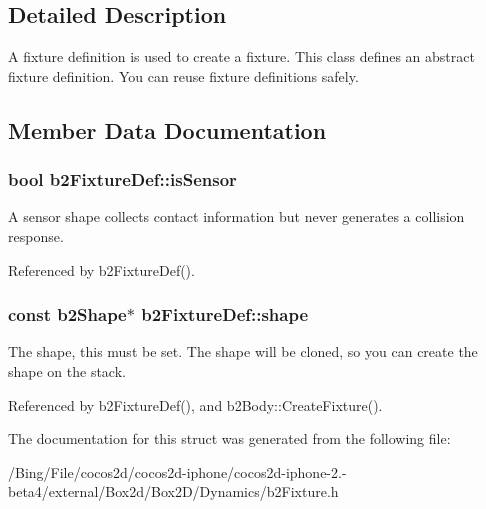 \subsection{Detailed Description}
A fixture definition is used to create a fixture. This class defines an abstract fixture definition. You can reuse fixture definitions safely. 

\subsection{Member Data Documentation}
\hypertarget{structb2_fixture_def_ac8cfcc6208663c92861eaab3b3fdc57e}{
\subsubsection[{is\-Sensor}]{\setlength{\rightskip}{0pt plus 5cm}bool {\bf b2\-Fixture\-Def\-::is\-Sensor}}}\label{structb2_fixture_def_ac8cfcc6208663c92861eaab3b3fdc57e}
A sensor shape collects contact information but never generates a collision response. 

Referenced by b2\-Fixture\-Def().

\hypertarget{structb2_fixture_def_a1e41753d89abf3443e7897e2498a3240}{
\subsubsection[{shape}]{\setlength{\rightskip}{0pt plus 5cm}const {\bf b2\-Shape}$\ast$ {\bf b2\-Fixture\-Def\-::shape}}}\label{structb2_fixture_def_a1e41753d89abf3443e7897e2498a3240}
The shape, this must be set. The shape will be cloned, so you can create the shape on the stack. 

Referenced by b2\-Fixture\-Def(), and b2\-Body\-::\-Create\-Fixture().



The documentation for this struct was generated from the following file\-:\begin{DoxyCompactItemize}
\item 
/\-Bing/\-File/cocos2d/cocos2d-\/iphone/cocos2d-\/iphone-\/2.-\/beta4/external/\-Box2d/\-Box2\-D/\-Dynamics/b2\-Fixture.\-h\end{DoxyCompactItemize}
